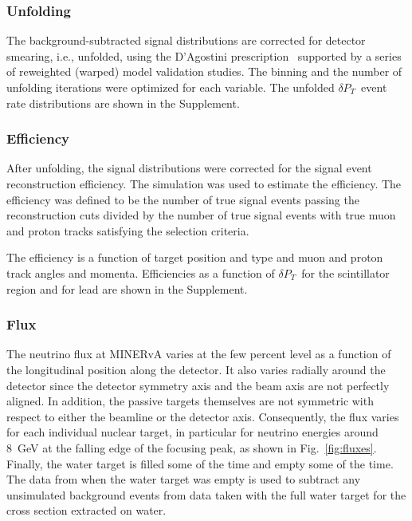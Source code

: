 \documentclass[aps,prd,twocolumn,showpacs,superscriptaddress,floatfix]{revtex4-2}  %
\newcommand{\tkidelta}{\ensuremath{\delta P_{T}}\xspace}
\begin{document}
\subsubsection{Unfolding}

The background-subtracted signal distributions are corrected for detector smearing, i.e., unfolded, using the D'Agostini prescription~\cite{DAgostini:1994fjx,DAgostini:2010hil} supported by a series of reweighted (warped) model validation studies.  The binning and the number of unfolding iterations were optimized for each variable.  The unfolded \tkidelta \ event rate distributions are shown in the Supplement.

\subsubsection{Efficiency}

After unfolding, the signal distributions were corrected for the signal event reconstruction efficiency.  The simulation was used to estimate the efficiency.  The efficiency was defined to be the number of true signal events passing the reconstruction cuts divided by the number of true signal events with true muon and proton tracks satisfying the selection criteria.  

The efficiency is a  function of target position and type and muon and proton track angles and momenta.  %
Efficiencies as a function of \tkidelta\ for the scintillator region and for lead are shown in the Supplement.

\subsubsection{Flux}

The neutrino flux at MINERvA varies at the few percent level as a function of the longitudinal position along the detector.  It also varies radially around the detector since the detector symmetry axis and the beam axis are not perfectly aligned. In addition, the passive targets themselves are not symmetric with respect to either the beamline or the detector axis. 
Consequently, the flux varies for each individual nuclear target, in particular for neutrino energies around 8~GeV at the falling edge of the focusing peak, as shown in Fig.~\ref{fig:fluxes}. 
Finally, the water target is filled some of the time and empty some of the time. The data from when the water target was empty is used to subtract any unsimulated background events from data taken with the full water target for the cross section extracted on water. 
\end{document}
